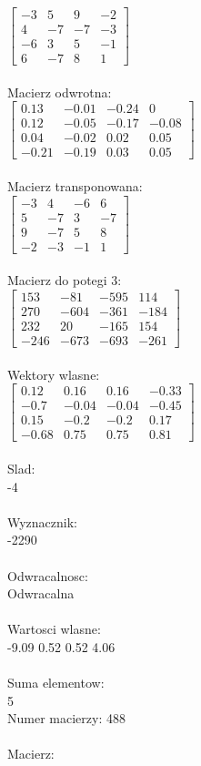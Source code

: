\documentclass[a4paper,12pt]{article}
\begin{document}
$\begin{bmatrix} -3&5&9&-2\\4&-7&-7&-3\\-6&3&5&-1\\6&-7&8&1 \end{bmatrix}$
\\
\\
Macierz odwrotna:\\

$\begin{bmatrix} 0.13&-0.01&-0.24&0\\0.12&-0.05&-0.17&-0.08\\0.04&-0.02&0.02&0.05\\-0.21&-0.19&0.03&0.05 \end{bmatrix}$
\\
\\
Macierz transponowana:\\

$\begin{bmatrix} -3&4&-6&6\\5&-7&3&-7\\9&-7&5&8\\-2&-3&-1&1 \end{bmatrix}$
\\
\\
Macierz do potegi 3:\\

$\begin{bmatrix} 153&-81&-595&114\\270&-604&-361&-184\\232&20&-165&154\\-246&-673&-693&-261 \end{bmatrix}$
\\
\\
Wektory wlasne:\\

$\begin{bmatrix} 0.12&0.16&0.16&-0.33\\-0.7&-0.04&-0.04&-0.45\\0.15&-0.2&-0.2&0.17\\-0.68&0.75&0.75&0.81 \end{bmatrix}$
\\
\\
Slad:\\
-4
\\
\\
Wyznacznik:\\
-2290
\\
\\
Odwracalnosc:\\
Odwracalna
\\
\\
Wartosci wlasne:\\
-9.09 0.52 0.52 4.06
\\
\\
Suma elementow:\\
5
\\
\newpage
Numer macierzy:
488
\\
\\
Macierz:\\
\end{document}
